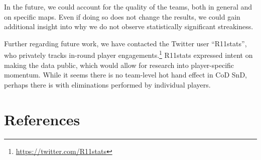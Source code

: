 \documentclass{article}
\begin{document}
In the future, we could account for the quality of the teams, both in
general and on specific maps. Even if doing so does not change the
results, we could gain additional insight into why we do not observe
statistically significant streakiness.

Further regarding future work, we have contacted the Twitter user
``R11stats'', who privately tracks in-round player
engagements.\footnote{\url{https://twitter.com/R11stats}} R11stats
expressed intent on making the data public, which would allow for
research into player-specific momentum. While it seems there is no
team-level hot hand effect in CoD SnD, perhaps there is with
eliminations performed by individual players.

\hypertarget{references}{%
\section*{References}\label{references}}
\end{document}
